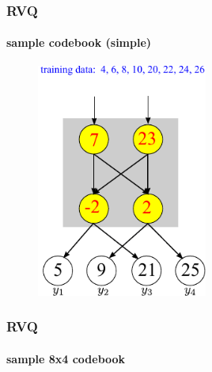 \begin{frame}
\frametitle{RVQ}
\framesubtitle{sample codebook (simple)}
\mypagenum{}
\begin{figure}[t]
\centering
\includegraphics[width=0.5\textwidth]{thesis/RVQ_introduction.pdf}
\end{figure}
\end{frame}


\begin{frame}
\frametitle{RVQ}
\framesubtitle{sample 8x4 codebook}
\logoCSIPCPL\mypagenum
\setcounter{subfigure}{0}
\begin{figure}[h!]
\centering{}
\end{figure}
\end{frame}



